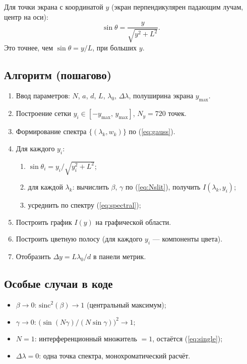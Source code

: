 \documentclass[12pt,a4paper]{article}
\begin{document}
Для точки экрана с координатой \(y\) (экран перпендикулярен падающим лучам, центр на оси):
\[
\sin\theta = \frac{y}{\sqrt{y^2+L^2}}.
\]
Это точнее, чем \(\sin\theta=y/L\), при больших \(y\).

\subsection{Алгоритм (пошагово)}

\begin{enumerate}
  \item Ввод параметров: \(N\), \(a\), \(d\), \(L\), \(\lambda_0\), \(\Delta\lambda\),
        полуширина экрана \(y_{\max}\).
  \item Построение сетки \(y_i\in[-y_{\max},\,y_{\max}]\), \(N_y=720\) точек.
  \item Формирование спектра \(\{(\lambda_k,w_k)\}\) по (\ref{eq:gauss}).
  \item Для каждого \(y_i\):
  \begin{enumerate}[label=\alph*)]
    \item \(\sin\theta_i = y_i/\sqrt{y_i^2+L^2}\);
    \item для каждой \(\lambda_k\): вычислить \(\beta\), \(\gamma\) по
          (\ref{eq:Nslit}), получить \(I(\lambda_k,y_i)\);
    \item усреднить по спектру (\ref{eq:spectral});
  \end{enumerate}
  \item Построить график \(I(y)\) на графической области.
  \item Построить цветную полосу (для каждого \(y_i\) — компоненты цвета).
  \item Отобразить \(\Delta y=L\lambda_0/d\) в панели метрик.
\end{enumerate}

\subsection{Особые случаи в коде}

\begin{itemize}
  \item \(\beta\to0\): \(\mathrm{sinc}^2(\beta)\to1\) (центральный максимум);
  \item \(\gamma\to0\): \(\bigl(\sin(N\gamma)/(N\sin\gamma)\bigr)^2\to1\);
  \item \(N=1\): интерференционный множитель \(=1\), остаётся (\ref{eq:single});
  \item \(\Delta\lambda=0\): одна точка спектра, монохроматический расчёт.
\end{itemize}
\end{document}

